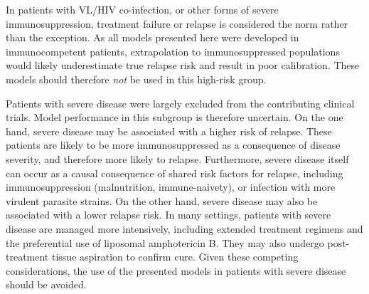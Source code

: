 In patients with VL/HIV co-infection, or other forms of severe immunosuppression, treatment failure or relapse is considered the norm rather than the exception\cite{abongomera2017a}. As all models presented here were developed in immunocompetent patients, extrapolation to immunosuppressed populations would likely underestimate true relapse risk and result in poor calibration. These models should therefore \textit{not} be used in this high-risk group.

Patients with severe disease were largely excluded from the contributing clinical trials. Model performance in this subgroup is therefore uncertain. On the one hand, severe disease may be associated with a higher risk of relapse. These patients are likely to be more immunosuppressed as a consequence of disease severity, and therefore more likely to relapse. Furthermore, severe disease itself can occur as a causal consequence of shared risk factors for relapse, including immunosuppression (malnutrition, immune-naivety), or infection with more virulent parasite strains\cite{rai2013}. On the other hand, severe disease may also be associated with a lower relapse risk. In many settings, patients with severe disease are managed more intensively, including extended treatment regimens and the preferential use of liposomal amphotericin B. They may also undergo post-treatment tissue aspiration to confirm cure. Given these competing considerations, the use of the presented models in patients with severe disease should be avoided.


